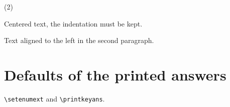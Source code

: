 \documentclass{article}
\begin{document}
\begin{enumext*}[columns=2,item-break=true,labelwidth=2cm,labelsep=5mm]
  \item(2) {\centering Centered text, the indentation must be kept.\par}

    {\raggedright Text aligned to the left in the second paragraph.\par}
\end{enumext*}

\section{Defaults of the printed answers}

\texttt{\textbackslash setenumext} and \texttt{\textbackslash printkeyans}.



\end{document}
